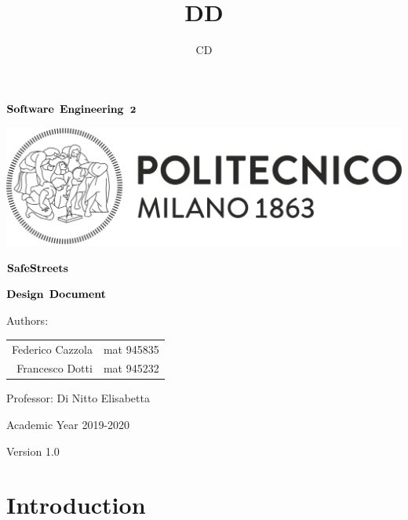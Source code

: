 \documentclass{article}
\author{CD}
\title{DD}
\begin{document}
\thispagestyle{empty} %
\begin{center}

	\vspace{3cm}

	\large $\bf Software$ $\bf Engineering$ $\bf 2$

  \includegraphics[width=\linewidth]{../RASD/images/polimi-logo.png}
  \vspace{2cm}
  

  \Huge $\bf SafeStreets$


	\huge $\bf Design$  $\bf Document$

	\vspace{1cm}

  Authors:
	\vspace{1cm}
	\begin{tabular}{r|l}
		 Federico Cazzola & \large mat 945835\\
		 Francesco Dotti & \large mat 945232\\
	\end{tabular}

	\vspace{1cm}

  Professor: Di Nitto Elisabetta
	
	\vspace{3cm}
  \normalsize Academic Year 2019-2020

	\vspace{2mm}
	\small Version 1.0

\end{center}

\newpage

\thispagestyle{empty} %
\tableofcontents

\newpage
  
\section{Introduction}
\end{document}
